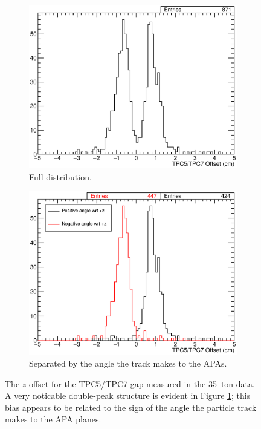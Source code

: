 \begin{figure}
  \centering
  \begin{subfigure}[t]{0.48\linewidth}
    \centering
    \includegraphics[width=\textwidth]{TPC5TPC7Gap.eps}
    \caption{Full distribution.}
    \label{fig:TPC5TPC7Gap}
  \end{subfigure}
  \hfill
  \begin{subfigure}[t]{0.48\linewidth}
    \centering
    \includegraphics[width=\textwidth]{TPC5TPC7GapAngle.eps}
    \caption{Separated by the angle the track makes to the APAs.}
    \label{fig:TPC5TPC7GapAngle}
  \end{subfigure}
  \caption{The $z$-offset for the TPC5/TPC7 gap measured in the 35~ton data.  A very noticable double-peak structure is evident in Figure \ref{fig:TPC5TPC7Gap}; this bias appears to be related to the sign of the angle the particle track makes to the APA planes.}
  \label{fig:TPC5TPC7XOffsetZOffset}
\end{figure}

